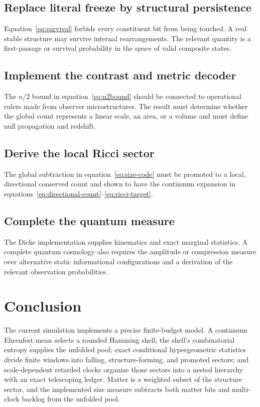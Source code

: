 \documentclass[11pt]{article}
\begin{document}
\subsection*{Replace literal freeze by structural persistence}
Equation~\eqref{eq:survival} forbids every constituent bit from being touched.
A real stable structure may survive internal rearrangements.  The relevant
quantity is a first-passage or survival probability in the space of valid
composite states.

\subsection*{Implement the contrast and metric decoder}
The $n/2$ bound in equation~\eqref{eq:n2bound} should be connected to
operational rulers made from observer microstructures.  The result must
determine whether the global count represents a linear scale, an area, or a
volume and must define null propagation and redshift.

\subsection*{Derive the local Ricci sector}
The global subtraction in equation~\eqref{eq:size-code} must be promoted to a
local, directional conserved count and shown to have the continuum expansion
in equations~\eqref{eq:directional-count}--\eqref{eq:ricci-target}.

\subsection*{Complete the quantum measure}
The Dicke implementation supplies kinematics and exact marginal statistics.
A complete quantum cosmology also requires the amplitude or compression
measure over alternative static informational configurations and a derivation
of the relevant observation probabilities.

\section{Conclusion}
\label{sec:conclusion}

The current simulation implements a precise finite-budget model.  A
continuum Ehrenfest mean selects a rounded Hamming shell; the shell's
combinatorial entropy supplies the unfolded pool; exact conditional
hypergeometric statistics divide finite windows into falling,
structure-forming, and promoted sectors; and scale-dependent retarded clocks
organize those sectors into a nested hierarchy with an exact telescoping
ledger.  Matter is a weighted subset of the structure sector, and the
implemented size measure subtracts both matter bits and multi-clock backlog
from the unfolded pool.
\end{document}
